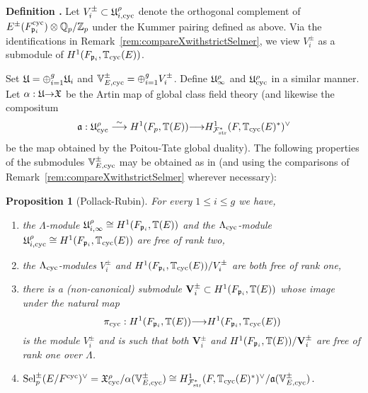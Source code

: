 \documentclass[12pt]{amsart}
\numberwithin{equation}{section}
\newenvironment{define}{\par\medskip\noindent\refstepcounter{thm}
\bgroup{\hspace*{-0.15 cm}\bf{Definition}
\thethm.}\bgroup}{\egroup \egroup\par\medskip}
\newtheorem{prop}[thm]{Proposition}
\begin{document}
\begin{define}
Let $V^\pm_i \subset \frak{U}_{i,\textup{cyc}}^{\rho}$ denote the orthogonal complement of $E^\pm(F^{\textup{cyc}}_{\frak{p}_i})\otimes{\mathbb{Q}}_p/{\mathbb{Z}}_p$ under the Kummer pairing defined as above. Via the identifications in Remark~\ref{rem:compareXwithstrictSelmer}, we view $V^\pm_i$ as a submodule of $H^1(F_{\frak{p}_i},{\mathbb{T}}_{\textup{cyc}}(E))$.
\end{define}
Set $\frak{U}=\oplus_{i=1}^g \frak{U}_i$ and $\mathbb{V}_{E,{\textup{cyc}}}^\pm=\oplus_{i=1}^g {V}_i^\pm$. Define $\frak{U}_{\infty}^\rho$ and $\frak{U}_{\textup{cyc}}^\rho$ in a similar manner. Let $\alpha:\frak{U}{\rightarrow} \frak{X}$ be the Artin map of global class field theory (and likewise the compositum
$$\frak{a}: \frak{U}_{\textup{cyc}}^\rho\stackrel{\sim}{\longrightarrow} H^1(F_p,{\mathbb{T}}(E)){\longrightarrow} H^1_{{\mathcal{F}}_{\textup{str}}^*}(F,{\mathbb{T}}_{\textup{cyc}}(E)^*)^\vee$$
be the map obtained by the Poitou-Tate global duality). The following properties of the submodules $\mathbb{V}_{E,{\textup{cyc}}}^\pm$ may be obtained as in \cite[Theorem 4.3 and Proposition 4.4]{pollackrubin} (and using the comparisons of Remark~\ref{rem:compareXwithstrictSelmer} wherever necessary):
\begin{prop}[Pollack-Rubin]For every $1\leq i\leq g$ we have,
\label{prop:pmstructureandselmer}
\begin{enumerate}
\item[(i)]  the ${\Lambda}$-module $\frak{U}_{i,\infty}^\rho\cong H^1(F_{\frak{p}_i},{\mathbb{T}}(E))$ and the ${\Lambda}_{\textup{cyc}}$-module  $\frak{U}_{i,\textup{cyc}}^\rho\cong H^1(F_{\frak{p}_i},{\mathbb{T}}_{\textup{cyc}}(E))$ are free of rank two,
\item[(ii)]  the ${\Lambda}_{\textup{cyc}}$-modules $V^\pm_i$ and $H^1(F_{\frak{p}_i},{\mathbb{T}}_{\textup{cyc}}(E))/V^\pm_i$ are both free of rank one,
\item[(iii)] there is a (non-canonical) submodule $\mathbf{V}^\pm_i \subset H^1(F_{\frak{p}_i},{\mathbb{T}}(E))$ whose image under the natural map 
$$\pi_{\textup{cyc}}:H^1(F_{\frak{p}_i},{\mathbb{T}}(E)) {\longrightarrow} H^1(F_{\frak{p}_i},{\mathbb{T}}_{\textup{cyc}}(E))$$ 
is the module $V^\pm_i$ and is such that both $\mathbf{V}^\pm_i $ and $H^1(F_{\frak{p}_i},{\mathbb{T}}(E))/\mathbf{V}^\pm_i$ are free of rank one over ${\Lambda}$.
\item[(iv)] $\textup{Sel}_p^\pm(E/F^{\textup{cyc}})^\vee=\frak{X}_{\textup{cyc}}^\rho/\alpha(\mathbb{V}_{E,{\textup{cyc}}}^\pm)\cong H^1_{{\mathcal{F}}_{\textup{str}}^*}(F,{\mathbb{T}}_{\textup{cyc}}(E)^*)^\vee/\frak{a}(\mathbb{V}_{E,{\textup{cyc}}}^\pm)\,.$
\end{enumerate}
\end{prop}
\end{document}
